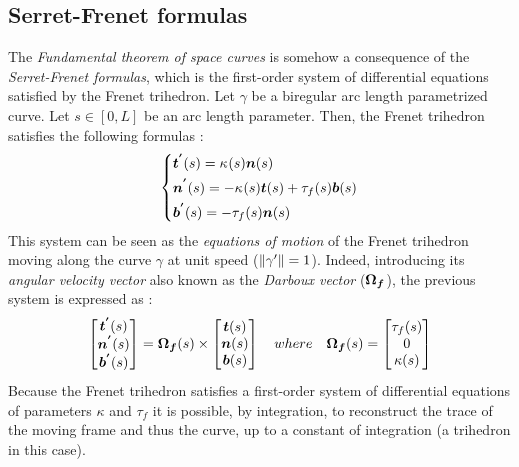 \subsection{Serret-Frenet formulas}\label{sec:serret}
The \emph{Fundamental theorem of space curves} is somehow a consequence of the \emph{Serret-Frenet formulas}, which is the first-order system of differential equations satisfied by the Frenet trihedron. Let $\gamma$ be a biregular arc length parametrized curve. Let $s \in [0,L]$ be an arc length parameter. Then, the Frenet trihedron satisfies the following formulas :
\begin{equation}
	\left\{
	\begin{aligned}
		&\boldsymbol{t^{'}}(s) 	=  \kappa_{}(s) \boldsymbol{n}(s)\\
		&\boldsymbol{n^{'}}(s) 	=  -\kappa_{}(s) \boldsymbol{t}(s) + \tau_f(s) \boldsymbol{b}(s) \\
		&\boldsymbol{b^{'}}(s) 	=  -\tau_f(s) \boldsymbol{n}(s) \\
	\end{aligned}
	\right.
\end{equation}
This system can be seen as the \emph{equations of motion} of the Frenet trihedron moving along the curve $\gamma$ at unit speed ($\lVert\gamma'\rVert=1$). Indeed, introducing its \emph{angular velocity vector} also known as the \emph{Darboux vector} ($\boldsymbol{\Omega_f}$), the previous system is expressed as :
\begin{equation}
	\begin{bmatrix}		
		\boldsymbol{t^{'}}(s) \\
		\boldsymbol{n^{'}}(s) \\
		\boldsymbol{b^{'}}(s) \\
	\end{bmatrix}
	=
	\boldsymbol{\Omega_f}(s)
	\times
	\begin{bmatrix}		
		\boldsymbol{t}(s) \\
		\boldsymbol{n}(s) \\
		\boldsymbol{b}(s) \\
	\end{bmatrix}
	\quad where \quad
	\boldsymbol{\Omega_f}(s)
	=
	\begin{bmatrix}
		\tau_f(s) \\
		0 \\
		\kappa(s)
	\end{bmatrix}
\end{equation}
Because the Frenet trihedron satisfies a first-order system of differential equations of parameters $\kappa$ and $\tau_f$ it is possible, by integration, to reconstruct the trace of the moving frame and thus the curve, up to a constant of integration (a trihedron in this case).

